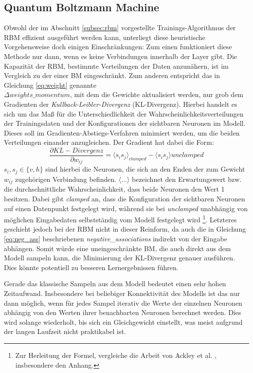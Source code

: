\subsection{Quantum Boltzmann Machine}
\label{subsec:qbm}
Obwohl der im Abschnitt \ref{subsec:rbm} vorgestellte Trainings-Algorithmus der RBM effizient ausgeführt werden kann, unterliegt diese heuristische Vorgehensweise doch einigen Einschränkungen: Zum einen funktioniert diese Methode nur dann, wenn es keine Verbindungen innerhalb der Layer gibt. Die Kapazität der RBM, bestimmte Verteilungen der Daten anzunähern, ist im Vergleich zu der einer BM eingeschränkt. Zum anderen entspricht das in Gleichung \ref{eq:weight} genannte \\$\Delta weights\_momentum$, mit dem die Gewichte aktualisiert werden, nur grob dem Gradienten der \emph{Kullback-Leibler-Divergenz} (KL-Divergenz). Hierbei handelt es sich um das Maß für die Unterschiedlichkeit der Wahrscheinlichkeitsverteilungen der Trainingsdaten und der Konfigurationen der sichtbaren Neuronen im Modell. Dieses soll im Gradienten-Abstiegs-Verfahren minimiert werden, um die beiden Verteilungen einander anzugleichen. Der Gradient hat dabei die Form:
\begin{equation} \label{eq:kl-gradient}
\frac{\partial KL-Divergenz}{\partial w_{ij}} = \langle s_i s_j \rangle_{clamped} - \langle s_i s_j \rangle{unclamped}
\end{equation}
$s_i, s_j \in \{v, h\}$ sind hierbei die Neuronen, die sich an den Enden der zum Gewicht $w_{ij}$ zugehörigen Verbindung befinden. $\langle ... \rangle$ bezeichnet den Erwartungswert bzw. die durchschnittliche Wahrscheinlichkeit, dass beide Neuronen den Wert 1 besitzen. Dabei gibt \emph{clamped} an, dass die Konfiguration der sichtbaren Neuronen auf einen Datenpunkt festgelegt wird, während sie bei \emph{unclamped} unabhängig von möglichen Eingabedaten selbstständig vom Modell festgelegt wird \footnote{Zur Herleitung der Formel, vergleiche die Arbeit von Ackley et al. \cite{ackley1985learning}, insbesondere den Anhang.}. Letzteres geschieht jedoch bei der RBM nicht in dieser Reinform, da auch die in Gleichung \ref{eq:neg_ass} beschriebenen \emph{negative\_associations} indirekt von der Eingabe abhängen. Somit würde eine uneingeschränkte BM, die auch direkt aus dem Modell sampeln kann, die Minimierung der KL-Divergenz genauer ausführen. Dies könnte potentiell zu besseren Lernergebnissen führen.~\cite{hinton2012practical, ackley1985learning, Adachi15}

Gerade das klassische Sampeln aus dem Modell bedeutet einen sehr hohen Zeitaufwand. Insbesondere bei beliebiger Konnektivität des Modells ist das nur dann möglich, wenn für jedes Sampel iterativ die Werte der einzelnen Neuronen abhängig von den Werten ihrer benachbarten Neuronen berechnet werden. Dies wird solange wiederholt, bis sich ein Gleichgewicht einstellt, was meist aufgrund der langen Laufzeit nicht praktikabel ist.~\cite{Amin18, ackley1985learning, Adachi15}

